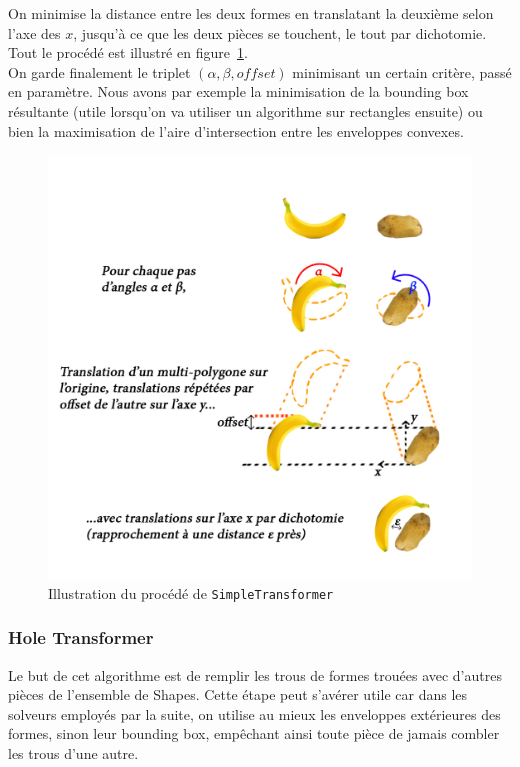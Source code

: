 On minimise la distance entre les deux formes en translatant la deuxième selon l'axe des $x$, jusqu'à ce que les deux pièces se touchent, le tout par dichotomie. Tout le procédé est illustré en figure~\ref{fig:simpletransformer}.\\

On garde finalement le triplet $(\alpha, \beta, offset)$ minimisant un certain critère, passé en paramètre. Nous avons par exemple la minimisation de la bounding box résultante (utile lorsqu'on va utiliser un algorithme sur rectangles ensuite) ou bien la maximisation de l'aire d'intersection entre les enveloppes convexes.


\begin{figure}[!htb]
\includegraphics[scale=0.4]{img/simpletransformer.png}
\caption{Illustration du procédé de \texttt{SimpleTransformer}}
\label{fig:simpletransformer}
\end{figure}

\subsubsection{Hole Transformer}
Le but de cet algorithme est de remplir les trous de formes trouées avec d'autres pièces de l'ensemble de Shapes. Cette étape peut s'avérer utile car dans les solveurs employés par la suite, on utilise au mieux les enveloppes extérieures des formes, sinon leur bounding box, empêchant ainsi toute pièce de jamais combler les trous d'une autre. 

